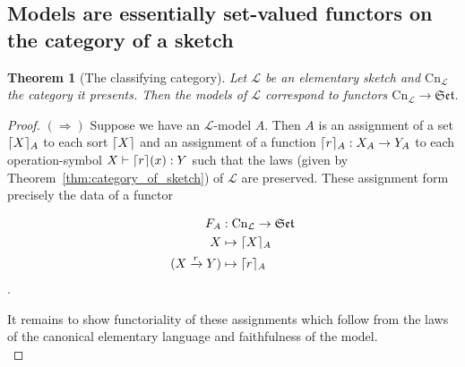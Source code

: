 \documentclass[12pt,twoside]{reedthesis}
\theoremstyle{definition}
\theoremstyle{remark}
\theoremstyle{plain}
\newtheorem{theorem}{Theorem}
\DeclarePairedDelimiter\ceil{\lceil}{\rceil}
\begin{document}
\subsection{Models are essentially set-valued functors on the category of a sketch}
\newcommand{\clone}[3]{{\text{Cn}_{#1} (#2,#3)}}
\newcommand{\cn}{\mathrm{Cn}}
\begin{theorem}[The classifying category]\label{thm:classify_elem_sketch}
  Let $\mathcal{L}$ be an elementary sketch and \( \cn_{\mathcal{L}} \) the
  category it presents. Then the models of $\mathcal{L}$ correspond to functors
  $\cn_{\mathcal{L}} \rightarrow \mathfrak{Set}$.
\end{theorem}
\begin{proof}
  \( (\Rightarrow) \) Suppose we have an \( \mathcal{L}\)-model $A$. Then $A$ is an
  assignment of a set $\ceil{X}_{A}$ to each sort \( \ceil{X}\) and an
  assignment of a function \( \ceil{r}_{A} : X_{A} \rightarrow Y_{A}\) to each operation-symbol
  \( X \vdash \ceil{r}(x) : Y\) such that the laws (given by
  Theorem~\ref{thm:category_of_sketch}) of \( \mathcal{L} \) are preserved. These
  assignment form precisely the data of a functor

  \begin{align*}
   F_{A} &: \cn_{\mathcal{L}} \rightarrow \mathfrak{Set} \\
    X &\mapsto \ceil{X}_{A} \\
    (X \xrightarrow{r} Y) &\mapsto \ceil{r}_{A}
  \end{align*}.

  It remains to show functoriality of these assignments which follow from the
  laws of the canonical elementary language and faithfulness of the model. \\


\end{proof}
\end{document}
